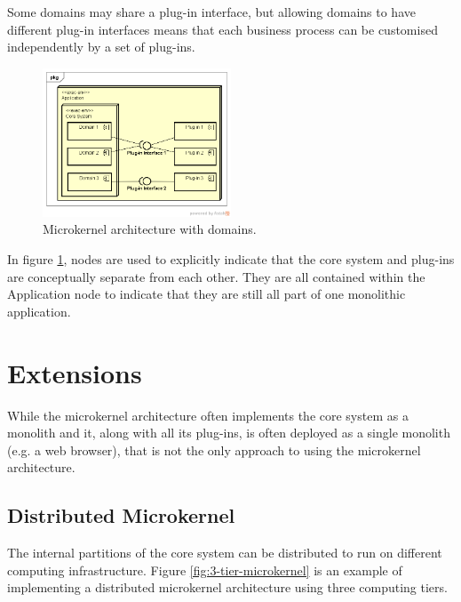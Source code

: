 Some domains may share a plug-in interface, but allowing domains to have different plug-in interfaces
means that each business process can be customised independently by a set of plug-ins.

\begin{figure}[h!]
    \centering
    \includegraphics[trim=38 42 23 42,clip,width=0.5\textwidth]{diagrams/domain-microkernel.png}
    \caption{Microkernel architecture with domains.}
    \label{fig:microkernel-domains}
\end{figure}

In figure \ref{fig:microkernel-domains}, nodes are used to explicitly indicate that the core system and plug-ins are conceptually separate from each other.
They are all contained within the Application node to indicate that they are still all part of one monolithic application.


\section{Extensions}

While the microkernel architecture often implements the core system as a monolith
and it, along with all its plug-ins, is often deployed as a single monolith
(e.g. a web browser), that is not the only approach to using the microkernel architecture.

\subsection{Distributed Microkernel}

The internal partitions of the core system can be distributed to run on different computing infrastructure.
Figure \ref{fig:3-tier-microkernel} is an example of implementing a distributed microkernel architecture using three computing tiers.

